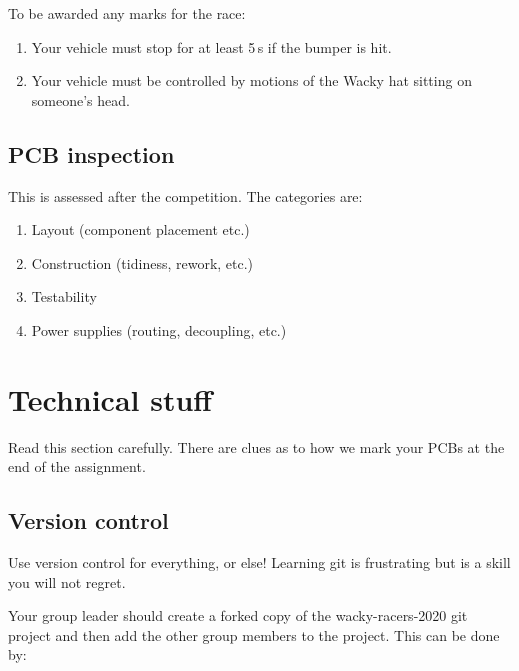 \documentclass[11pt, a4paper]{article}
\begin{document}
To be awarded any marks for the race:
%
\begin{enumerate}
\item Your vehicle must stop for at least 5\,s if the bumper is hit.

\item Your vehicle must be controlled by motions of the Wacky hat
  sitting on someone's head.
\end{enumerate}


\subsection{PCB inspection}

This is assessed after the competition.  The categories are:
%
\begin{enumerate}
\item Layout (component placement etc.)
\item Construction (tidiness, rework, etc.)
\item Testability  
\item Power supplies (routing, decoupling, etc.)
\end{enumerate}



\section{Technical stuff}

Read this section carefully.  There are clues as to how we mark your
PCBs at the end of the assignment.


\subsection{Version control}

Use version control for everything, or else!  Learning git is
frustrating but is a skill you will not regret.

Your group leader should create a forked copy of the wacky-racers-2020
git project and then add the other group members to the project.  This
can be done by:
\end{document}
